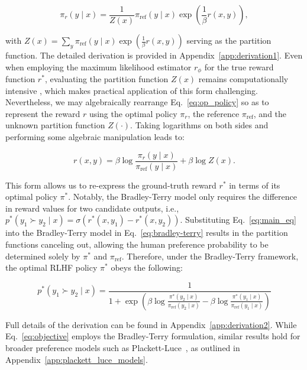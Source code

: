\begin{equation}\label{eq:op_policy}
    \pi_r(y\mid x) = \frac{1}{Z(x)}\pi_\text{ref}(y\mid x)\exp\left(\frac{1}{\beta}r(x, y)\right),
\end{equation}

with $Z(x) =\sum_{y}\pi_\text{ref}(y\mid x)\exp\left(\frac{1}{\beta}r(x, y)\right)$ serving as the partition function. The detailed derivation is provided in Appendix~\ref{app:derivation1}. Even when employing the maximum likelihood estimator $r_\phi$ for the true reward function $r^*$, evaluating the partition function $Z(x)$ remains computationally intensive \citep{korbak2022reinforcement, go2023aligning}, which makes practical application of this form challenging. Nevertheless, we may algebraically rearrange Eq.~\ref{eq:op_policy} so as to represent the reward $r$ using the optimal policy $\pi_r$, the reference $\pi_\text{ref}$, and the unknown partition function $Z(\cdot)$. Taking logarithms on both sides and performing some algebraic manipulation leads to:

\begin{equation}\label{eq:main_eq}
    r(x,y) =\beta \log \frac{\pi_r(y\mid x)}{\pi_\text{ref}(y\mid x)} + \beta \log Z(x).
\end{equation}

This form allows us to re-express the ground-truth reward $r^*$ in terms of its optimal policy $\pi^*$. Notably, the Bradley-Terry model only requires the difference in reward values for two candidate outputs, i.e., ${p^*(y_1 \succ y_2 \mid x) = \sigma(r^*(x, y_1) - r^*(x, y_2))}$. Substituting Eq.~\ref{eq:main_eq} into the Bradley-Terry model in Eq.~\ref{eq:bradley-terry} results in the partition functions canceling out, allowing the human preference probability to be determined solely by $\pi^*$ and $\pi_\text{ref}$. Therefore, under the Bradley-Terry framework, the optimal RLHF policy $\pi^*$ obeys the following:

\begin{equation}\label{eq:objective}
    p^*(y_1\succ y_2 \mid x)=\frac{1}{1 + \exp\left(\beta \log \frac{\pi^*(y_2\mid x)}{\pi_\text{ref}(y_2\mid x)} - \beta \log \frac{\pi^*(y_1\mid x)}{\pi_\text{ref}(y_1\mid x)}\right)}
\end{equation}

Full details of the derivation can be found in Appendix~\ref{app:derivation2}. While Eq.~\ref{eq:objective} employs the Bradley-Terry formulation, similar results hold for broader preference models such as Plackett-Luce~\citep{plackett1975analysis, luce2012individual}, as outlined in Appendix~\ref{app:plackett_luce_models}.

